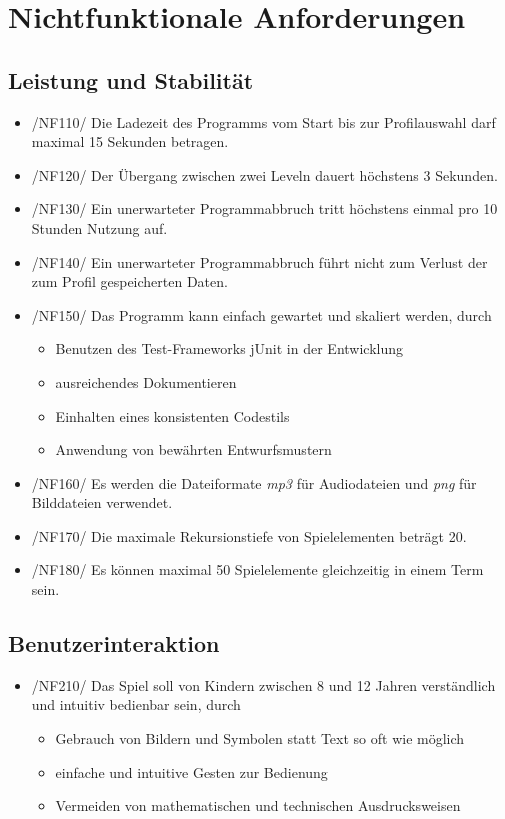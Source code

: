 \section{Nichtfunktionale Anforderungen}

\subsection{Leistung und Stabilität}

\begin{itemize}
\item /NF110/ Die Ladezeit des Programms vom Start bis zur Profilauswahl darf maximal 15 Sekunden betragen.
\item /NF120/ Der \"Ubergang zwischen zwei Leveln dauert höchstens 3 Sekunden.
\item /NF130/ Ein unerwarteter Programmabbruch tritt höchstens einmal pro 10 Stunden Nutzung auf.
\item /NF140/ Ein unerwarteter Programmabbruch führt nicht zum Verlust der zum Profil gespeicherten Daten.
\item /NF150/ Das Programm kann einfach gewartet und skaliert werden, durch
\begin{itemize}
\item Benutzen des Test-Frameworks jUnit in der Entwicklung
\item ausreichendes Dokumentieren
\item Einhalten eines konsistenten Codestils
\item Anwendung von bewährten Entwurfsmustern
\end{itemize}
\item /NF160/ Es werden die Dateiformate \textit{mp3} für Audiodateien und \textit{png} für Bilddateien verwendet.
\item /NF170/ Die maximale Rekursionstiefe von Spielelementen beträgt 20.
\item /NF180/ Es können maximal 50 Spielelemente gleichzeitig in einem Term sein.
\end{itemize}

\subsection{Benutzerinteraktion}
\begin{itemize}
\item /NF210/ Das Spiel soll von Kindern zwischen 8 und 12 Jahren verständlich und intuitiv bedienbar sein, durch
\begin{itemize}
\item Gebrauch von Bildern und Symbolen statt Text so oft wie möglich
\item einfache und intuitive Gesten zur Bedienung
\item Vermeiden von mathematischen und technischen Ausdrucksweisen
\end{itemize}
\end{itemize}

